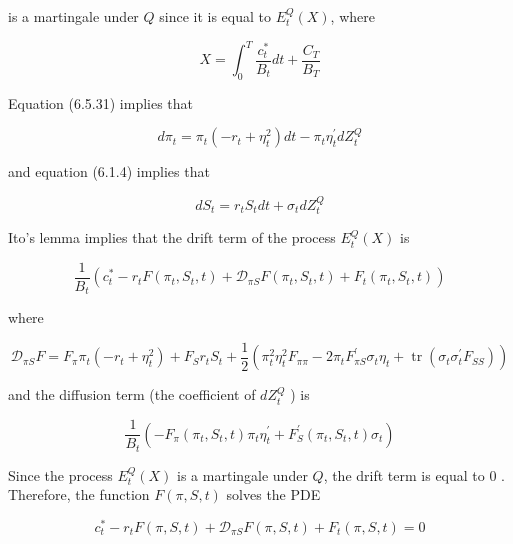\documentclass[\topdir/lecture\_notes.tex]{subfiles}
\begin{document}
is a martingale under $Q$ since it is equal to $E_{t}^{Q}(X)$, where

\begin{equation}
X=\int_{0}^{T} \frac{c_{t}^{*}}{B_{t}} d t+\frac{C_{T}}{B_{T}}
\end{equation}

Equation (6.5.31) implies that

\begin{equation}
d \pi_{t}=\pi_{t}\left(-r_{t}+\eta_{t}^{2}\right) d t-\pi_{t} \eta_{t}^{\prime} d Z_{t}^{Q}
\end{equation}

and equation (6.1.4) implies that

\begin{equation}
d S_{t}=r_{t} S_{t} d t+\sigma_{t} d Z_{t}^{Q}
\end{equation}

Ito's lemma implies that the drift term of the process $E_{t}^{Q}(X)$ is

\begin{equation}
\frac{1}{B_{t}}\left(c_{t}^{*}-r_{t} F\left(\pi_{t}, S_{t}, t\right)+\mathcal{D}_{\pi S} F\left(\pi_{t}, S_{t}, t\right)+F_{t}\left(\pi_{t}, S_{t}, t\right)\right)
\end{equation}

where

\begin{equation}
\mathcal{D}_{\pi S} F=F_{\pi} \pi_{t}\left(-r_{t}+\eta_{t}^{2}\right)+F_{S} r_{t} S_{t}+\frac{1}{2}\left(\pi_{t}^{2} \eta_{t}^{2} F_{\pi \pi}-2 \pi_{t} F_{\pi S}^{\prime} \sigma_{t} \eta_{t}+\operatorname{tr}\left(\sigma_{t} \sigma_{t}^{\prime} F_{S S}\right)\right)
\end{equation}

and the diffusion term (the coefficient of $d Z_{t}^{Q}$ ) is

\begin{equation}
\frac{1}{B_{t}}\left(-F_{\pi}\left(\pi_{t}, S_{t}, t\right) \pi_{t} \eta_{t}^{\prime}+F_{S}^{\prime}\left(\pi_{t}, S_{t}, t\right) \sigma_{t}\right)
\end{equation}

Since the process $E_{t}^{Q}(X)$ is a martingale under $Q$, the drift term is equal to 0 . Therefore, the function $F(\pi, S, t)$ solves the PDE

\begin{equation}
c_{t}^{*}-r_{t} F(\pi, S, t)+\mathcal{D}_{\pi S} F(\pi, S, t)+F_{t}(\pi, S, t)=0 \label{eq:6.5.32}
\end{equation}
\end{document}
